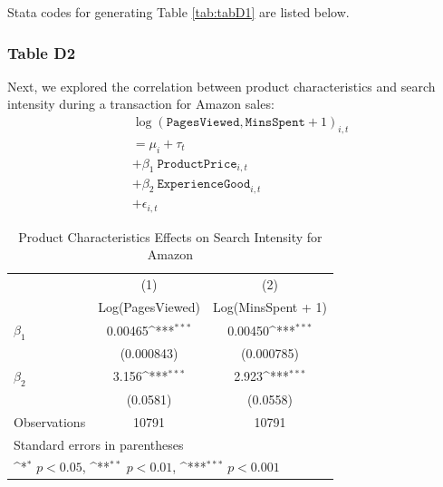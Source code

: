 \documentclass{article}
\begin{document}
Stata codes for generating Table \ref{tab:tabD1} are listed below.

\pagebreak

\subsubsection{Table D2}
Next, we explored the correlation between product characteristics and search intensity during a transaction for Amazon sales:
\begin{equation}
	\begin{aligned}
		& \log\left( \texttt{PagesViewed}, \texttt{MinsSpent} + 1\right)_{i,t} \\ &= \mu_{i} + \tau_{t} 
		\\ &+ \beta_1 \ \texttt{ProductPrice}_{i,t} 
		\\ &+ \beta_2 \ \texttt{ExperienceGood}_{i,t} 
		\\ & + \epsilon_{i,t}
	\end{aligned}
\end{equation}
\begin{table}[!h]\centering
	\def\sym#1{\ifmmode^{#1}\else\(^{#1}\)\fi}
	\caption{Product Characteristics Effects on Search Intensity for Amazon}
	\label{tab:tabD2}
	\begin{tabular}{l*{2}{c}}
		\\[-1.8ex]\hline 
		\hline
		&\multicolumn{1}{c}{(1)}&\multicolumn{1}{c}{(2)}\\
		&\multicolumn{1}{c}{Log(PagesViewed)}&\multicolumn{1}{c}{Log(MinsSpent + 1)}\\
		\midrule
		$\beta_1$       &     0.00465\sym{***}&     0.00450\sym{***}\\
		&  (0.000843)         &  (0.000785)         \\
		\addlinespace
		$\beta_2$      &       3.156\sym{***}&       2.923\sym{***}\\
		&    (0.0581)         &    (0.0558)         \\
		\midrule
		Observations        &       10791         &       10791         \\
		\bottomrule
		\multicolumn{3}{l}{\footnotesize Standard errors in parentheses}\\
		\multicolumn{3}{l}{\footnotesize \sym{*} \(p<0.05\), \sym{**} \(p<0.01\), \sym{***} \(p<0.001\)}\\
	\end{tabular}
\end{table}
\end{document}
